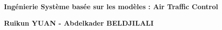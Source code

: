
\begin{titlepage}
	\parindent=0pt
 
\addtolength{\wpXoffset}{-4.5cm}

	
	\hrulefill
	\begin{center}\bfseries\Huge
		\color{white}
		{Ingénierie Système basée sur les modèles : Air Traffic Control} 
	\end{center}
	\hrulefill
	
	\vspace*{1cm}
	\begin{center}\bfseries\Large
			\color{white}
		{Ruikun YUAN - Abdelkader BELDJILALI}
		
	\end{center}
	


\end{titlepage}